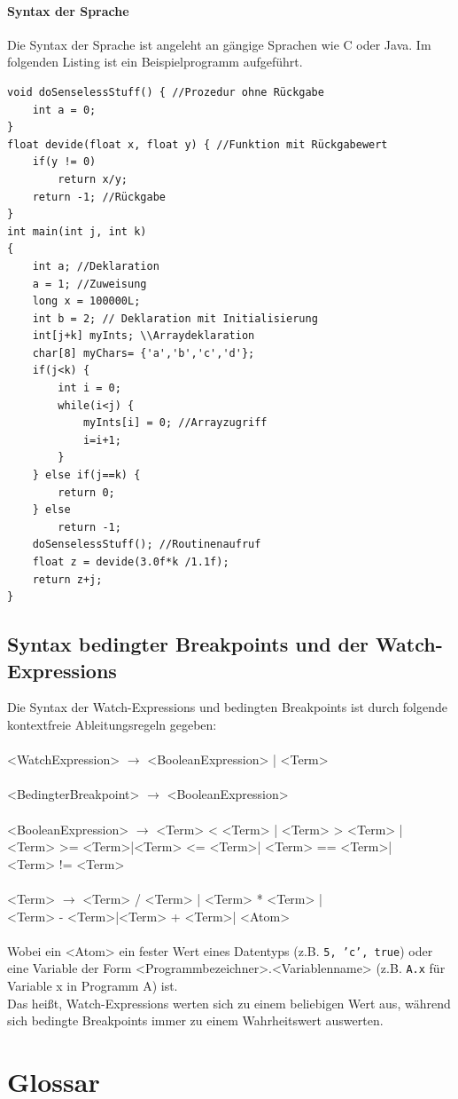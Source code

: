 \documentclass[parskip=full]{scrartcl}
\begin{document}
\paragraph{Syntax der Sprache}
Die Syntax der Sprache ist angeleht an gängige Sprachen wie C oder Java. Im folgenden Listing ist ein Beispielprogramm aufgeführt. 

\begin{verbatim}
void doSenselessStuff() { //Prozedur ohne Rückgabe
    int a = 0;
}
float devide(float x, float y) { //Funktion mit Rückgabewert
    if(y != 0)	
        return x/y;
    return -1; //Rückgabe
}
int main(int j, int k)
{
    int a; //Deklaration
    a = 1; //Zuweisung
    long x = 100000L; 
    int b = 2; // Deklaration mit Initialisierung
    int[j+k] myInts; \\Arraydeklaration
    char[8] myChars= {'a','b','c','d'};
    if(j<k) {
        int i = 0;
        while(i<j) {
            myInts[i] = 0; //Arrayzugriff
            i=i+1;
        }	
    } else if(j==k) {
        return 0;
    } else
        return -1;
    doSenselessStuff(); //Routinenaufruf
    float z = devide(3.0f*k /1.1f);
    return z+j;
}
\end{verbatim}
\subsection{Syntax bedingter Breakpoints und der Watch-Expressions}
Die Syntax der Watch-Expressions und bedingten Breakpoints ist durch folgende kontextfreie Ableitungsregeln gegeben: \\\\
<WatchExpression> $\rightarrow$ <BooleanExpression> | <Term>\\\\
<BedingterBreakpoint> $\rightarrow$ <BooleanExpression>\\\\<BooleanExpression> $\rightarrow$ <Term> < <Term> 
| <Term> > <Term> |\\ <Term> >= <Term>|<Term> <= <Term>| <Term> == <Term>| \\<Term> != <Term>\\\\
<Term> $\rightarrow$ <Term> / <Term> 
| <Term> * <Term> |\\ <Term> - <Term>|<Term> + <Term>| <Atom>\\\\

Wobei ein <Atom> ein fester Wert eines Datentyps (z.B. \texttt{5, 'c', true}) oder eine Variable der Form <Programmbezeichner>.<Variablenname> (z.B. \texttt{A.x} für Variable x in Programm A) ist. \\
Das heißt, Watch-Expressions werten sich zu einem beliebigen Wert aus, während sich bedingte Breakpoints immer zu einem Wahrheitswert auswerten.



\section{Glossar}
\printglossary[style=altlist,title=Glossar]
\end{document}
